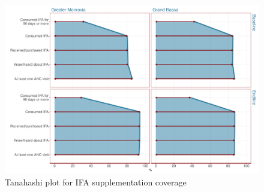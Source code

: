 \documentclass[12pt,a4paper]{article}
\begin{document}
\begin{figure}[H]

{\centering \includegraphics{liberiaCoverageFinalReport_files/figure-latex/ifaTanahashiPlot-1} 

}

\caption{Tanahashi plot for IFA supplementation coverage}\label{fig:ifaTanahashiPlot}
\end{figure}
\end{document}
